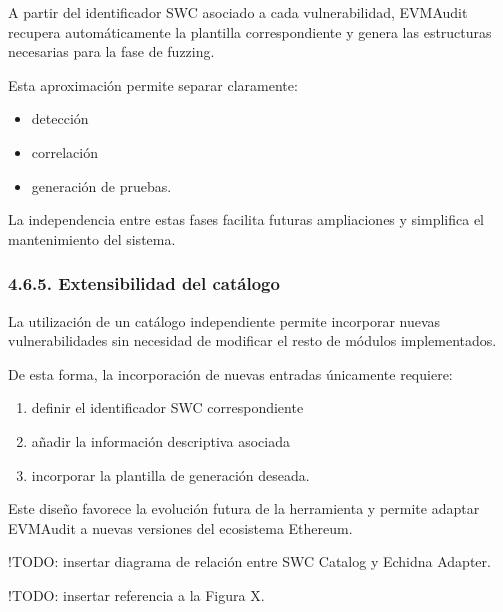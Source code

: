 A partir del identificador SWC asociado a cada vulnerabilidad, EVMAudit
recupera automáticamente la plantilla correspondiente y genera las
estructuras necesarias para la fase de fuzzing.

Esta aproximación permite separar claramente:

\begin{itemize}
\tightlist
\item
  detección
\item
  correlación
\item
  generación de pruebas.
\end{itemize}

La independencia entre estas fases facilita futuras ampliaciones y
simplifica el mantenimiento del sistema.

\subsubsection{4.6.5. Extensibilidad del
catálogo}\label{extensibilidad-del-catuxe1logo}

La utilización de un catálogo independiente permite incorporar nuevas
vulnerabilidades sin necesidad de modificar el resto de módulos
implementados.

De esta forma, la incorporación de nuevas entradas únicamente requiere:

\begin{enumerate}
\def\labelenumi{\arabic{enumi}.}
\tightlist
\item
  definir el identificador SWC correspondiente
\item
  añadir la información descriptiva asociada
\item
  incorporar la plantilla de generación deseada.
\end{enumerate}

Este diseño favorece la evolución futura de la herramienta y permite
adaptar EVMAudit a nuevas versiones del ecosistema Ethereum.

!TODO: insertar diagrama de relación entre SWC Catalog y Echidna
Adapter.

!TODO: insertar referencia a la Figura X.
